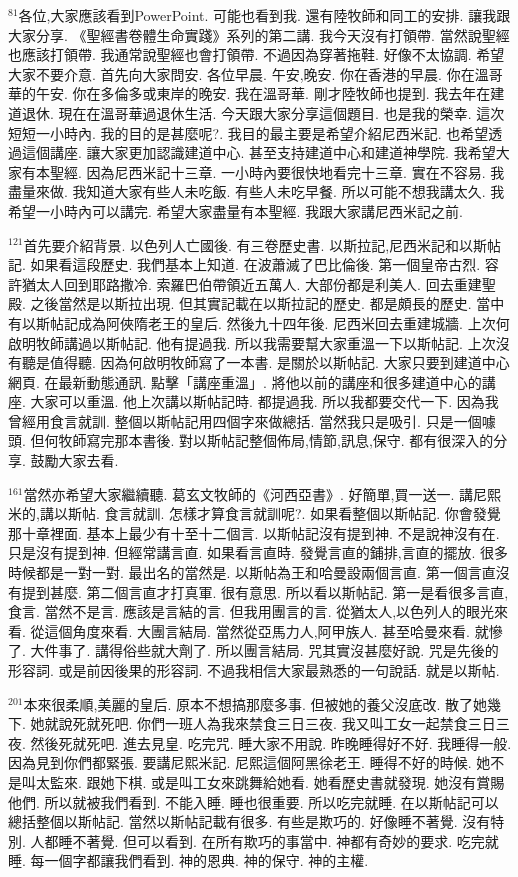 \documentclass{book}
\begin{document}
$^{81}$各位,大家應該看到PowerPoint.
可能也看到我.
還有陸牧師和同工的安排.
讓我跟大家分享.
《聖經書卷體生命實踐》系列的第二講.
我今天沒有打領帶.
當然說聖經也應該打領帶.
我通常說聖經也會打領帶.
不過因為穿著拖鞋.
好像不太協調.
希望大家不要介意.
首先向大家問安.
各位早晨.
午安,晚安.
你在香港的早晨.
你在溫哥華的午安.
你在多倫多或東岸的晚安.
我在溫哥華.
剛才陸牧師也提到.
我去年在建道退休.
現在在溫哥華過退休生活.
今天跟大家分享這個題目.
也是我的榮幸.
這次短短一小時內.
我的目的是甚麼呢?.
我目的最主要是希望介紹尼西米記.
也希望透過這個講座.
讓大家更加認識建道中心.
甚至支持建道中心和建道神學院.
我希望大家有本聖經.
因為尼西米記十三章.
一小時內要很快地看完十三章.
實在不容易.
我盡量來做.
我知道大家有些人未吃飯.
有些人未吃早餐.
所以可能不想我講太久.
我希望一小時內可以講完.
希望大家盡量有本聖經.
我跟大家講尼西米記之前.

$^{121}$首先要介紹背景.
以色列人亡國後.
有三卷歷史書.
以斯拉記,尼西米記和以斯帖記.
如果看這段歷史.
我們基本上知道.
在波蕭滅了巴比倫後.
第一個皇帝古烈.
容許猶太人回到耶路撒冷.
索羅巴伯帶領近五萬人.
大部份都是利美人.
回去重建聖殿.
之後當然是以斯拉出現.
但其實記載在以斯拉記的歷史.
都是頗長的歷史.
當中有以斯帖記成為阿俠隋老王的皇后.
然後九十四年後.
尼西米回去重建城牆.
上次何啟明牧師講過以斯帖記.
他有提過我.
所以我需要幫大家重溫一下以斯帖記.
上次沒有聽是值得聽.
因為何啟明牧師寫了一本書.
是關於以斯帖記.
大家只要到建道中心網頁.
在最新動態通訊.
點擊「講座重溫」.
將他以前的講座和很多建道中心的講座.
大家可以重溫.
他上次講以斯帖記時.
都提過我.
所以我都要交代一下.
因為我曾經用食言就訓.
整個以斯帖記用四個字來做總括.
當然我只是吸引.
只是一個噱頭.
但何牧師寫完那本書後.
對以斯帖記整個佈局,情節,訊息,保守.
都有很深入的分享.
鼓勵大家去看.

$^{161}$當然亦希望大家繼續聽.
葛玄文牧師的《河西亞書》.
好簡單,買一送一.
講尼熙米的,講以斯帖.
食言就訓.
怎樣才算食言就訓呢?.
如果看整個以斯帖記.
你會發覺那十章裡面.
基本上最少有十至十二個言.
以斯帖記沒有提到神.
不是說神沒有在.
只是沒有提到神.
但經常講言直.
如果看言直時.
發覺言直的鋪排,言直的擺放.
很多時候都是一對一對.
最出名的當然是.
以斯帖為王和哈曼設兩個言直.
第一個言直沒有提到甚麼.
第二個言直才打真軍.
很有意思.
所以看以斯帖記.
第一是看很多言直,食言.
當然不是言.
應該是言結的言.
但我用團言的言.
從猶太人,以色列人的眼光來看.
從這個角度來看.
大團言結局.
當然從亞馬力人,阿甲族人.
甚至哈曼來看.
就慘了.
大件事了.
講得俗些就大劑了.
所以團言結局.
咒其實沒甚麼好說.
咒是先後的形容詞.
或是前因後果的形容詞.
不過我相信大家最熟悉的一句說話.
就是以斯帖.

$^{201}$本來很柔順,美麗的皇后.
原本不想搞那麼多事.
但被她的養父沒底改.
散了她幾下.
她就說死就死吧.
你們一班人為我來禁食三日三夜.
我又叫工女一起禁食三日三夜.
然後死就死吧.
進去見皇.
吃完咒.
睡大家不用說.
昨晚睡得好不好.
我睡得一般.
因為見到你們都緊張.
要講尼熙米記.
尼熙這個阿黑徐老王.
睡得不好的時候.
她不是叫太監來.
跟她下棋.
或是叫工女來跳舞給她看.
她看歷史書就發現.
她沒有賞賜他們.
所以就被我們看到.
不能入睡.
睡也很重要.
所以吃完就睡.
在以斯帖記可以總括整個以斯帖記.
當然以斯帖記載有很多.
有些是欺巧的.
好像睡不著覺.
沒有特別.
人都睡不著覺.
但可以看到.
在所有欺巧的事當中.
神都有奇妙的要求.
吃完就睡.
每一個字都讓我們看到.
神的恩典.
神的保守.
神的主權.
\end{document}
